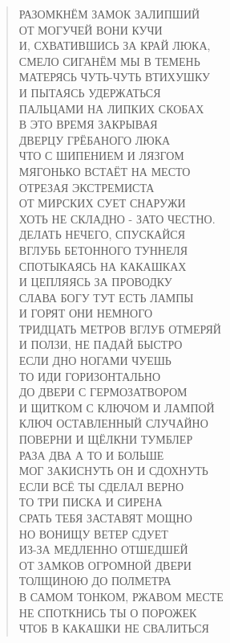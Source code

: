 \begin{verse}
РАЗОМКНЁМ ЗАМОК ЗАЛИПШИЙ\\
ОТ МОГУЧЕЙ ВОНИ КУЧИ\\
И, СХВАТИВШИСЬ ЗА КРАЙ ЛЮКА,\\
СМЕЛО СИГАНЁМ МЫ В ТЕМЕНЬ\\
МАТЕРЯСЬ ЧУТЬ-ЧУТЬ ВТИХУШКУ \\
И ПЫТАЯСЬ УДЕРЖАТЬСЯ\\
ПАЛЬЦАМИ НА ЛИПКИХ СКОБАХ\\
В ЭТО ВРЕМЯ ЗАКРЫВАЯ \\
ДВЕРЦУ ГРЁБАНОГО ЛЮКА\\
ЧТО С ШИПЕНИЕМ И ЛЯЗГОМ\\
МЯГОНЬКО ВСТАЁТ НА МЕСТО\\
ОТРЕЗАЯ ЭКСТРЕМИСТА\\
ОТ МИРСКИХ СУЕТ СНАРУЖИ\\
ХОТЬ НЕ СКЛАДНО - ЗАТО ЧЕСТНО.\\
ДЕЛАТЬ НЕЧЕГО, СПУСКАЙСЯ\\
ВГЛУБЬ БЕТОННОГО ТУННЕЛЯ\\
СПОТЫКАЯСЬ НА КАКАШКАХ\\
И ЦЕПЛЯЯСЬ ЗА ПРОВОДКУ\\
СЛАВА БОГУ ТУТ ЕСТЬ ЛАМПЫ\\
И ГОРЯТ ОНИ НЕМНОГО\\
ТРИДЦАТЬ МЕТРОВ ВГЛУБ ОТМЕРЯЙ\\
И ПОЛЗИ, НЕ ПАДАЙ БЫСТРО\\
ЕСЛИ ДНО НОГАМИ ЧУЕШЬ\\
ТО ИДИ ГОРИЗОНТАЛЬНО\\
ДО ДВЕРИ С ГЕРМОЗАТВОРОМ\\
И ЩИТКОМ С КЛЮЧОМ И ЛАМПОЙ\\
КЛЮЧ ОСТАВЛЕННЫЙ СЛУЧАЙНО\\
ПОВЕРНИ И ЩЁЛКНИ ТУМБЛЕР\\
РАЗА ДВА А ТО И БОЛЬШЕ\\
МОГ ЗАКИСНУТЬ ОН И СДОХНУТЬ\\
ЕСЛИ ВСЁ ТЫ СДЕЛАЛ ВЕРНО\\
ТО ТРИ ПИСКА И СИРЕНА\\
СРАТЬ ТЕБЯ ЗАСТАВЯТ МОЩНО\\
НО ВОНИЩУ ВЕТЕР СДУЕТ\\
ИЗ-ЗА МЕДЛЕННО ОТШЕДШЕЙ\\
ОТ ЗАМКОВ ОГРОМНОЙ ДВЕРИ\\
ТОЛЩИНОЮ ДО ПОЛМЕТРА\\
В САМОМ ТОНКОМ, РЖАВОМ МЕСТЕ\\
НЕ СПОТКНИСЬ ТЫ О ПОРОЖЕК\\
ЧТОБ В КАКАШКИ НЕ СВАЛИТЬСЯ\\

\end{verse}
